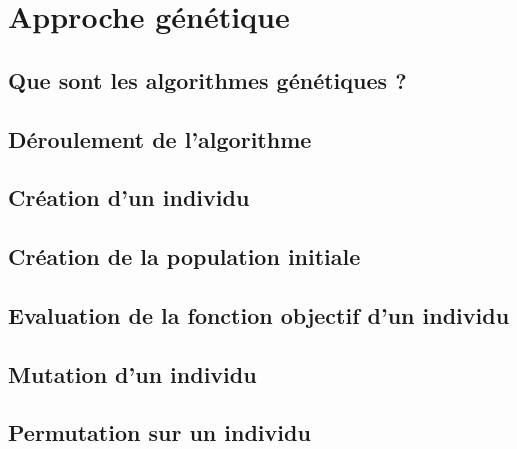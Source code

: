 \section{Approche génétique}

\subsection{Que sont les algorithmes génétiques ?}

\subsection{Déroulement de l'algorithme}



\subsection{Création d'un individu}



\subsection{Création de la population initiale}



\subsection{Evaluation de la fonction objectif d'un individu}





\subsection{Mutation d'un individu}



\subsection{Permutation sur un individu}

